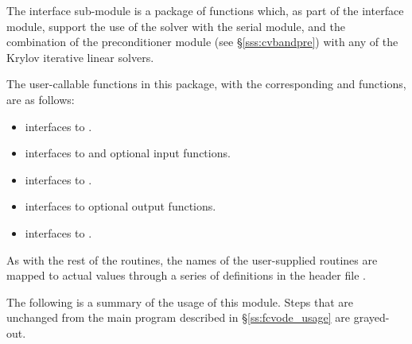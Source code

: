 The {\fcvbp} interface sub-module is a package of {\C} functions which,
as part of the {\fcvode} interface module, support the use of the
{\cvode} solver with the serial {\nvecs} module, and the combination of
the {\cvbandpre} preconditioner module (see \S\ref{sss:cvbandpre}) with
any of the Krylov iterative linear solvers.

The user-callable functions in this package, with the corresponding
{\cvode} and {\cvbandpre} functions, are as follows: 
\begin{itemize}
\item {}
  interfaces to .
\item {}
  interfaces to  and {\spgmr} optional input functions.
\item {}
  interfaces to .
\item {}
  interfaces to {\cvbandpre} optional output functions.
\item {}
  interfaces to .
\end{itemize}

As with the rest of the {\fcvode} routines, the names of the user-supplied
routines are mapped to actual values through a series of definitions in the
header file .

The following is a summary of the usage of this module. Steps that are unchanged
from the main program described in \S\ref{ss:fcvode_usage} are grayed-out.

